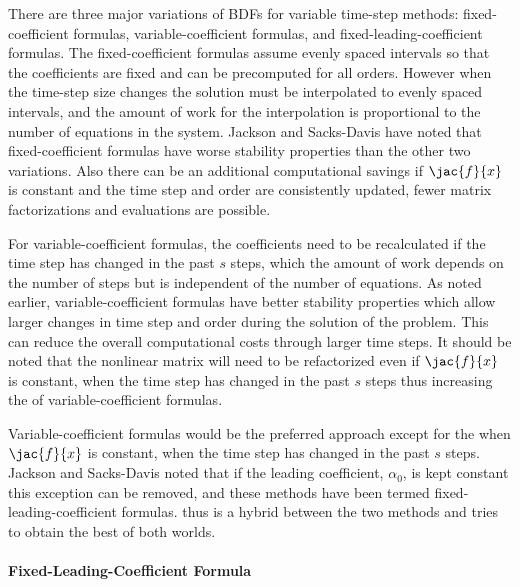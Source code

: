 There are three major variations of BDFs for variable time-step methods:
fixed-coefficient formulas, variable-coefficient formulas, and fixed-leading-coefficient
formulas. The fixed-coefficient formulas assume evenly spaced intervals
so that the coefficients are fixed and can be precomputed for all
orders\cite[p. 130]{AscherPetzold}. However when the time-step size
changes the solution must be interpolated to evenly spaced intervals,
and the amount of work for the interpolation is proportional to the
number of equations in the system. Jackson and Sacks-Davis\cite{Jackson1980}
have noted that fixed-coefficient formulas have worse stability properties
than the other two variations. Also there can be an additional computational
savings if $\jac{f}{x}$ is constant and the time step and order are
consistently updated, fewer matrix factorizations and evaluations
are possible.

For variable-coefficient formulas, the coefficients need to be recalculated
if the time step has changed in the past $s$ steps, which the amount
of work depends on the number of steps but is independent of the number
of equations. As noted earlier, variable-coefficient formulas have
better stability properties which allow larger changes in time step
and order during the solution of the problem. This can reduce the
overall computational costs through larger time steps. It should be
noted that the nonlinear matrix will need to be refactorized even
if $\jac{f}{x}$ is constant, when the time step has changed in the
past $s$ steps thus increasing the of variable-coefficient formulas.

Variable-coefficient formulas would be the preferred approach except
for the when $\jac{f}{x}$ is constant, when the time step has changed
in the past $s$ steps. Jackson and Sacks-Davis\cite{Jackson1980}
noted that if the leading coefficient, $\alpha_{0}$, is kept constant
this exception can be removed, and these methods have been termed
fixed-leading-coefficient formulas. thus is a hybrid between the two
methods and tries to obtain the best of both worlds.


\paragraph*{Fixed-Leading-Coefficient Formula\cite{BDF-FLC}}

